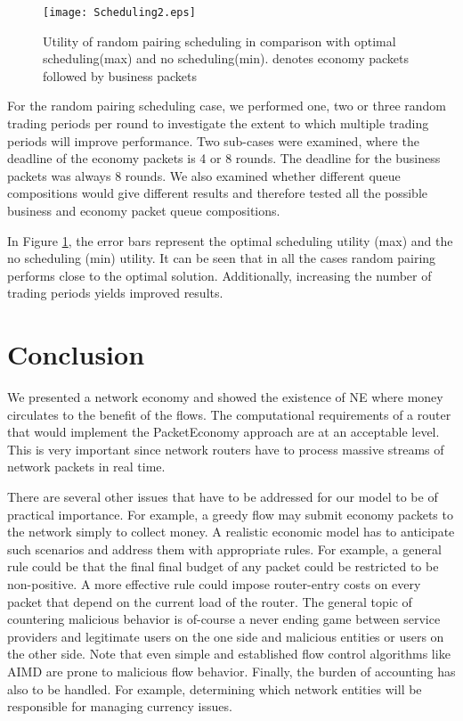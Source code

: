 \documentclass[letterpaper,10pt]{llncs}
\newcommand{\hla}[1]{\hl{#1}}
\renewcommand{\hla}[1]{#1}
\begin{document}
\begin{figure}[h!]
\begin{minipage}[b]{\linewidth}
\centering
\texttt{[image: Scheduling2.eps]}
\caption{Utility of random pairing scheduling in comparison with optimal scheduling(max) and no scheduling(min).  denotes  economy packets followed by  business packets}
\label{fig:Scheduling}
\end{minipage}
\end{figure}

For the random pairing scheduling case, we performed one, two or three random trading periods per round to investigate the extent to which multiple trading periods will improve performance. Two sub-cases were examined, where the deadline of the economy packets is 4 or 8 rounds. The deadline for the business packets was always 8 rounds. We also examined whether different queue compositions would give different results and therefore tested all the possible business and economy packet queue compositions.


In Figure \ref{fig:Scheduling}, the error bars represent the optimal scheduling utility (max) and the no scheduling (min) utility. It can be seen that in all the cases random pairing performs close to the optimal solution. Additionally, increasing the number of trading periods yields improved results.
 
\section{Conclusion}
\label{sec:conclusion}
We presented a network economy and showed the existence of NE 
where money circulates to the benefit of the flows.
The computational requirements of a router that would implement
the PacketEconomy approach are at an acceptable level. This is very important
since network routers have to process massive streams of network packets in
real time.

There are several other issues that have to be addressed
for our model to be of practical importance. For example,
a greedy flow may submit economy packets to the network simply to collect
money. A realistic economic model has to anticipate such scenarios and address 
them with appropriate rules. For example, a general rule could be that the final 
final budget of any packet could be restricted to be non-positive. A more effective 
rule could impose router-entry costs on every packet that depend on the current load 
of the router. \hla{The general topic of countering malicious behavior is of-course 
a never ending game between service providers and legitimate users on the one side 
and malicious entities or users on the other side.
Note that even simple and established flow control algorithms like AIMD 
are prone to malicious flow behavior.}
Finally, the burden of accounting has also to be handled.
For example, determining which network entities will be responsible for managing currency 
issues.
\end{document}
